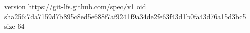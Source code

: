 version https://git-lfs.github.com/spec/v1
oid sha256:7da7159d7b895c8ed5e688f7af9241f9a34de2fe63f43d1b0fa43d76a15d3bc5
size 64
